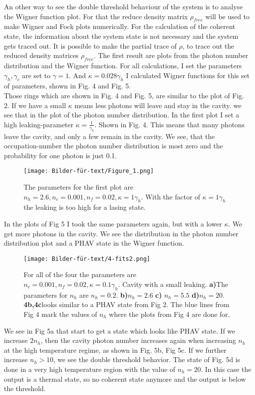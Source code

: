 \documentclass[12pt,a4paper]{article}
\begin{document}
\newpage
An other way to see the double threshold behaviour of the system is to analyse the Wigner function plot. For that the reduce density matrix $\rho_{free}$ will be used to make Wigner and Fock plots numerically. For the calculation of the coherent state, the information about the system state is not necessary and the system gets traced out. 
It is possible to make the partial trace of $\rho$, to trace out the reduced density matrices $\rho_{free}$. 
The first result are plots from the photon number distribution and the Wigner function.
 For all calculations, I set the parameters $\gamma_h, \gamma_c $ are set to $\gamma=1$. And $\kappa=0.028 \gamma_h$
I calculated Wigner functions for this set of parameters, shown in Fig. 4 and Fig. 5.\\
Those rings which are shown in Fig. 4 and Fig. 5, are similar to the plot of Fig. 2.
If we have a small $\kappa$ means less photons will leave and stay in the cavity. we see that in the plot of the photon number distribution.
In the first plot I set a high leaking-parameter $\kappa=\frac{1}{\gamma_h}$. Shown in Fig. 4.
This means that many photons leave the cavity, and only a few remain in the cavity. 
We see, that the occupation-number the photon number distribution is most zero and the probability for one photon is just 0.1.

\begin{figure}[hbtp]
\centering
\texttt{[image: Bilder-für-text/Figure\_1.png]}
\caption{The parameters for the first plot are $n_h=2.6, n_c=0.001, n_f=0.02, \kappa=1\gamma_h $. With  the factor of $\kappa=1\gamma_h$ the leaking is too high for a lasing state.}
\end{figure}\newpage

In the plots of Fig 5 I took the same parameters again, but with a lower $\kappa$. We get more photons in the cavity. We see the distribution in the photon number distribution plot and a PHAV state in the Wigner function. 
\begin{figure}[h!]
\centering
\texttt{[image: Bilder-für-text/4-fits2.png]}
\caption{For all of the four the parameters are $n_c=0.001, n_f=0.02, \kappa=0.1\gamma_h$. Cavity with a small leaking.
\textbf{a)}The parameters for $n_h$ are $n_h=0.2 $.
\textbf{b)}$ n_h=2.6$ 
\textbf{c)} $ n_h=5.5$ 
\textbf{d)}$ n_h=20$. 
\textbf{4b,4c}looks similar to a PHAV state from Fig 2. The blue lines from Fig 4 mark the values of $n_h$ where the plots from Fig 4 are done for. }
\end{figure}
\newpage
We see in Fig 5a that start to get a state which looks like PHAV state.
If we increase  $2n_h $,
then the cavity photon number increases again when increasing $n_h$ at the
high temperature regime, as shown in Fig. 5b, Fig 5c. 
If we further increase  $n_h >10$, we see the double threshold behavior. 
The state of Fig. 5d is done in a very high temperature region with the value of $n_h=20$. In this  case the output is a thermal state, so no coherent state anymore and the output is below the threshold.
\end{document}
